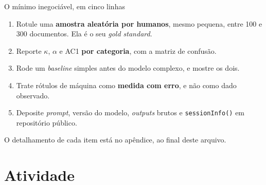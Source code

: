 \documentclass[11pt,aspectratio=169]{beamer}
\begin{document}
\begin{frame}{O mínimo inegociável, em cinco linhas}
\begin{enumerate}
  \item Rotule uma \textbf{amostra aleatória por humanos}, mesmo pequena, entre
        100 e 300 documentos. Ela é o seu \emph{gold standard}.
  \vspace{0.08cm}
  \item Reporte $\kappa$, $\alpha$ e AC1 \textbf{por categoria}, com a matriz de
        confusão.
  \vspace{0.08cm}
  \item Rode um \emph{baseline} simples antes do modelo complexo, e mostre os
        dois.
  \vspace{0.08cm}
  \item Trate rótulos de máquina como \textbf{medida com erro}, e não como dado
        observado.
  \vspace{0.08cm}
  \item Deposite \emph{prompt}, versão do modelo, \emph{outputs} brutos e
        \texttt{sessionInfo()} em repositório público.
\end{enumerate}
\vspace{0.25cm}
\centering
\small O detalhamento de cada item está no apêndice, ao final deste arquivo.
\end{frame}

\section{Atividade}
\end{document}
